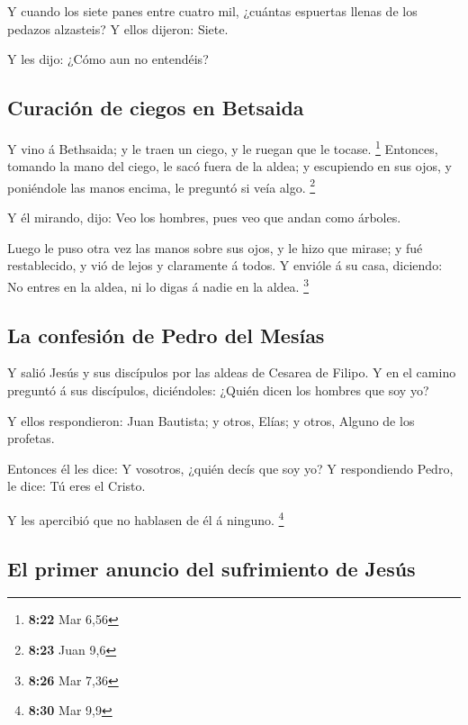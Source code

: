  Y cuando los siete panes entre cuatro mil, ¿cuántas
espuertas llenas de los pedazos alzasteis? Y ellos dijeron: Siete.

 Y les dijo: ¿Cómo aun no entendéis?

\hypertarget{curaciuxf3n-de-ciegos-en-betsaida}{%
\subsection{Curación de ciegos en
Betsaida}\label{curaciuxf3n-de-ciegos-en-betsaida}}

 Y vino á Bethsaida; y le traen un ciego, y le ruegan que
le tocase. \footnote{\textbf{8:22} Mar 6,56}  Entonces,
tomando la mano del ciego, le sacó fuera de la aldea; y escupiendo en
sus ojos, y poniéndole las manos encima, le preguntó si veía algo.
\footnote{\textbf{8:23} Juan 9,6}

 Y él mirando, dijo: Veo los hombres, pues veo que andan
como árboles.

 Luego le puso otra vez las manos sobre sus ojos, y le hizo
que mirase; y fué restablecido, y vió de lejos y claramente á todos.
 Y envióle á su casa, diciendo: No entres en la aldea, ni
lo digas á nadie en la aldea. \footnote{\textbf{8:26} Mar 7,36}

\hypertarget{la-confesiuxf3n-de-pedro-del-mesuxedas}{%
\subsection{La confesión de Pedro del
Mesías}\label{la-confesiuxf3n-de-pedro-del-mesuxedas}}

 Y salió Jesús y sus discípulos por las aldeas de Cesarea
de Filipo. Y en el camino preguntó á sus discípulos, diciéndoles: ¿Quién
dicen los hombres que soy yo?

 Y ellos respondieron: Juan Bautista; y otros, Elías; y
otros, Alguno de los profetas.

 Entonces él les dice: Y vosotros, ¿quién decís que soy yo?
Y respondiendo Pedro, le dice: Tú eres el Cristo.

 Y les apercibió que no hablasen de él á ninguno.
\footnote{\textbf{8:30} Mar 9,9}

\hypertarget{el-primer-anuncio-del-sufrimiento-de-jesuxfas}{%
\subsection{El primer anuncio del sufrimiento de
Jesús}\label{el-primer-anuncio-del-sufrimiento-de-jesuxfas}}

